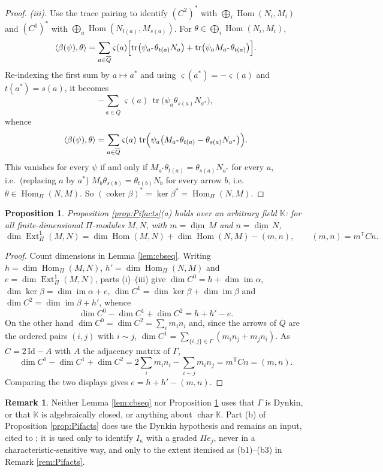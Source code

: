 \documentclass[reqno]{amsart}
\theoremstyle{plain}
\newtheorem{proposition}[theorem]{Proposition}
\theoremstyle{definition}
\newtheorem{remark}[theorem]{Remark}
\DeclareMathOperator{\Hom}{Hom}
\DeclareMathOperator{\Ext}{Ext}
\DeclareMathOperator{\im}{im}
\newcommand{\dimv}{\underline{\dim}\,}
\newcommand{\al}{\alpha}
\newcommand{\ka}{\kappa}
\newcommand{\Pia}{\Pi}
\begin{document}
\begin{proof}
\emph{(iii).}  Use the trace pairing to identify $(C^2)^{*}$ with
$\bigoplus_i\Hom(N_i,M_i)$ and $(C^1)^{*}$ with
$\bigoplus_{a}\Hom(N_{t(a)},M_{s(a)})$.  For $\theta\in\bigoplus_i\Hom(N_i,M_i)$,
\[
   \langle\beta(\psi),\theta\rangle
   =\sum_{a\in\overline{Q}}\varsigma(a)\Bigl[
     \operatorname{tr}\bigl(\psi_{a^{*}}\theta_{t(a)}N_a\bigr)
     +\operatorname{tr}\bigl(\psi_aM_{a^{*}}\theta_{t(a)}\bigr)\Bigr].
\]
Re-indexing the first sum by $a\mapsto a^{*}$ and using $\varsigma(a^{*})=-\varsigma(a)$
and $t(a^{*})=s(a)$, it becomes
\[
   -\sum_{a\in\overline{Q}}\varsigma(a)\,
   \operatorname{tr}\bigl(\psi_a\theta_{s(a)}N_{a^{*}}\bigr),
\]
whence
\[
   \langle\beta(\psi),\theta\rangle
   =\sum_{a\in\overline{Q}}\varsigma(a)\,\operatorname{tr}\Bigl(
     \psi_a\bigl(M_{a^{*}}\theta_{t(a)}-\theta_{s(a)}N_{a^{*}}\bigr)\Bigr).
\]
This vanishes for every $\psi$ if and only if
$M_{a^{*}}\theta_{t(a)}=\theta_{s(a)}N_{a^{*}}$ for every $a$, i.e.\ (replacing
$a$ by $a^{*}$) $M_b\theta_{s(b)}=\theta_{t(b)}N_b$ for every arrow $b$, i.e.\
$\theta\in\Hom_\Pia(N,M)$.  So $(\operatorname{coker}\beta)^{*}=\ker\beta^{*}
=\Hom_\Pia(N,M)$.
\end{proof}

\begin{proposition}\label{prop:ext1}
Proposition \ref{prop:Pifacts}\textup{(a)} holds over an arbitrary field
$\mathbb{K}$: for all finite-dimensional $\Pia$-modules $M,N$, with
$m=\dimv M$ and $n=\dimv N$,
\[
   \dim\Ext^1_\Pia(M,N)=\dim\Hom(M,N)+\dim\Hom(N,M)-(m,n),
   \qquad (m,n)=m^{\mathsf T}Cn .
\]
\end{proposition}

\begin{proof}
Count dimensions in Lemma \ref{lem:cbseq}.  Writing $h=\dim\Hom_\Pia(M,N)$,
$h'=\dim\Hom_\Pia(N,M)$ and $e=\dim\Ext^1_\Pia(M,N)$, parts (i)--(iii) give
$\dim C^0=h+\dim\im\al$, $\dim\ker\beta=\dim\im\al+e$,
$\dim C^1=\dim\ker\beta+\dim\im\beta$ and $\dim C^2=\dim\im\beta+h'$, whence
\[
   \dim C^0-\dim C^1+\dim C^2=h+h'-e .
\]
On the other hand $\dim C^0=\dim C^2=\sum_im_in_i$ and, since the arrows of
$\overline{Q}$ are the ordered pairs $(i,j)$ with $i\sim j$,
$\dim C^1=\sum_{\{i,j\}\in\Gamma}(m_in_j+m_jn_i)$.  As
$C=2\,\mathrm{Id}-A$ with $A$ the adjacency matrix of $\Gamma$,
\[
   \dim C^0-\dim C^1+\dim C^2=2\sum_im_in_i-\sum_{i\sim j}m_in_j
   =m^{\mathsf T}Cn=(m,n).
\]
Comparing the two displays gives $e=h+h'-(m,n)$.
\end{proof}

\begin{remark}
Neither Lemma \ref{lem:cbseq} nor Proposition \ref{prop:ext1} uses that
$\Gamma$ is Dynkin, or that $\mathbb{K}$ is algebraically closed, or anything
about $\operatorname{char}\mathbb{K}$.  Part \textup{(b)} of Proposition
\ref{prop:Pifacts} does use the Dynkin hypothesis and remains an input,
cited to \cite{BBK}; it is used only to identify $I_\ka$ with a graded
$\Pia e_j$, never in a characteristic-sensitive way, and only to the extent
itemised as \textup{(b1)}--\textup{(b3)} in Remark \ref{rem:Pifacts}.
\end{remark}
\end{document}
